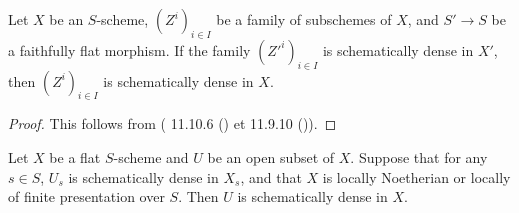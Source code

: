 \begin{lemma}\label{scheme schematically dense faithfully flat descent}
Let $X$ be an $S$-scheme, $(Z^i)_{i\in I}$ be a family of subschemes of $X$, and $S'\to S$ be a faithfully flat morphism. If the family $(Z'^i)_{i\in I}$ is schematically dense in $X'$, then $(Z^i)_{i\in I}$ is schematically dense in $X$.
\end{lemma}
\begin{proof}
This follows from (\cite{EGA4-3} 11.10.6 () et 11.9.10 ()). 
\end{proof}

\begin{corollary}\label{scheme flat open schematically dense if fiber is}
Let $X$ be a flat $S$-scheme and $U$ be an open subset of $X$. Suppose that for any $s\in S$, $U_s$ is schematically dense in $X_s$, and that $X$ is locally Noetherian or locally of finite presentation over $S$. Then $U$ is schematically dense in $X$.
\end{corollary}

